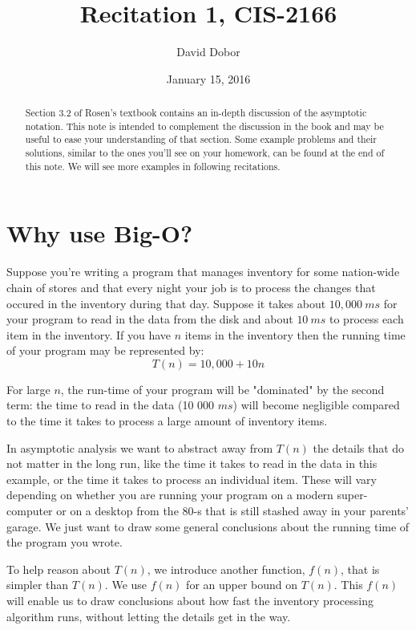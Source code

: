 \documentclass{tufte-handout}
\title{Recitation 1, CIS-2166}
\author{David Dobor}
\date{January 15, 2016} %
\begin{document}
\maketitle%

\begin{abstract}
\noindent
Section 3.2 of Rosen's textbook contains an in-depth discussion of the asymptotic notation.
This note is intended to complement the discussion in the book and may be useful
to ease your understanding of that section. Some example problems and 
their solutions, similar to the ones you'll see on your homework, can 
be found at the end of this note. We will see more examples in following recitations.\end{abstract}


\section{Why use Big-O?}

Suppose you're writing a program that manages inventory for some nation-wide chain
of stores and that every night your job is to process the changes that occured in the inventory 
during that day. 
Suppose it takes about $10, 000  \ ms$ for your program to read in the data from the disk and about 
$10 \ ms$ to process each item in the inventory. If you have $n$ items in the inventory then 
the running time of your program may be represented by:
$$
T(n) = 10, 000 + 10 n
$$




For large $n$, the run-time of your program will be "dominated" by the second term: the time to
read in the data (10 000 $ms$) will become negligible compared to the time it takes to process a 
large amount of inventory items.

In asymptotic analysis we want to abstract away from $T(n)$ the details that do not matter 
in the long run, like the time it takes to read in the data in this example, or the time it takes to process
an individual item. These will vary depending on whether you are running your program on a modern super-computer
or on a desktop from the 80-s that is still stashed away in your parents' garage. We just want to draw some general 
conclusions about the running time of the program you wrote. 

To help reason about $T(n)$, we introduce another
function, $f(n)$, that is simpler than $T(n)$.  We use $f(n)$ for an upper
bound on $T(n)$. This $f(n)$ will enable us to draw conclusions about how fast the inventory processing
algorithm runs, without letting the details get in the way.
\end{document}
